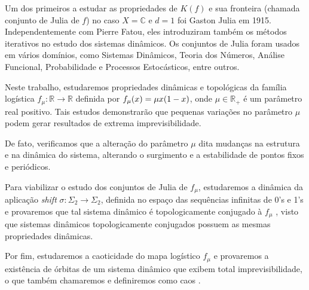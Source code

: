 \documentclass[12pt]{report}
\begin{document}
	Um dos primeiros a estudar as propriedades de $K(f)$ e sua fronteira (chamada conjunto de Julia de $f$) no caso $X = \mathbb{C}$ e $d = 1$ foi Gaston Julia em 1915. Independentemente com Pierre Fatou, eles introduziram também os métodos iterativos no estudo dos sistemas dinâmicos. Os conjuntos de Julia foram usados em vários domínios, como Sistemas Dinâmicos, Teoria dos Números, Análise Funcional, Probabilidade e Processos Estocásticos, entre outros.
	
	Neste trabalho, estudaremos propriedades dinâmicas e topológicas da família logística $f_\mu:\mathbb{R}\to\mathbb{R}$ definida por $f_\mu(x)=\mu\/x(1-x)$, onde $\mu \in \mathbb{R_+}$ é um parâmetro real positivo. Tais estudos demonstrarão que pequenas variações no parâmetro $\mu$ podem gerar resultados de extrema imprevisibilidade.
	
	De fato, verificamos que a alteração do parâmetro $\mu$ dita mudanças na estrutura e na dinâmica do sistema, alterando o surgimento e a estabilidade de pontos fixos e periódicos.
	
	Para viabilizar o estudo dos conjuntos de Julia de $f_\mu$, estudaremos a dinâmica da aplicação \textit{shift} $\sigma:\Sigma_2\to\Sigma_2$, definida no espaço das sequências infinitas de 0's e 1's e provaremos que tal sistema dinâmico é topologicamente conjugado à $f_\mu$ \cite{devaney}, visto que sistemas dinâmicos topologicamente conjugados possuem as mesmas propriedades dinâmicas.
	
	Por fim, estudaremos a caoticidade do mapa logístico $f_\mu$ e provaremos a existência de órbitas de um sistema dinâmico que exibem total imprevisibilidade, o que também chamaremos e definiremos como caos \cite{devaney}.

	
	
	
	
	
	
	
	
	
	
	
	
	
	
	
	
\end{document}
